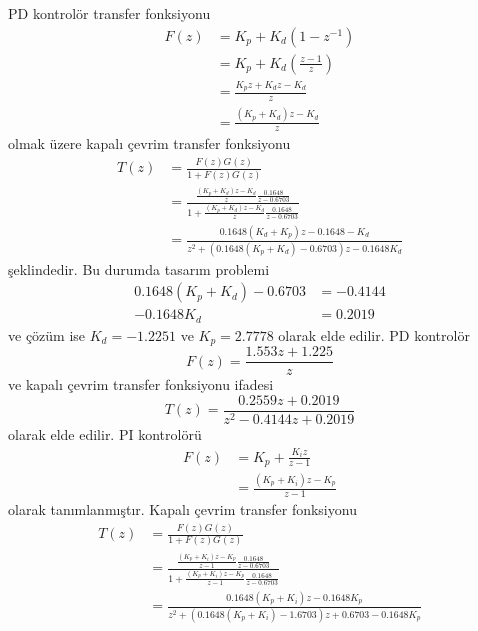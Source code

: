 PD kontrolör transfer fonksiyonu
\begin{equation}
\begin{split}
    F(z)&=K_p+K_d(1-z^{-1})\\
    &=K_p+K_d(\frac{z-1}{z})\\
    &=\frac{K_pz+K_dz-K_d}{z}\\
    &=\frac{(K_p+K_d)z-K_d}{z}
\end{split}
\end{equation}
olmak üzere kapalı çevrim transfer fonksiyonu
\begin{equation}
    \begin{split}
        T(z)&=\frac{F(z)G(z)}{1+F(z)G(z)}\\
        &=\frac{\frac{(K_p+K_d)z-K_d}{z}\frac{0.1648}{z-0.6703}}{1+\frac{(K_p+K_d)z-K_d}{z}\frac{0.1648}{z-0.6703}}\\
        &=\frac{0.1648(K_d+K_p)z-0.1648-K_d}{z^2+(0.1648(K_p+K_d)-0.6703)z-0.1648K_d}
    \end{split}
\end{equation}
şeklindedir. Bu durumda tasarım problemi
\begin{equation}
    \begin{split}
        0.1648(K_p+K_d)-0.6703&=-0.4144\\
        -0.1648K_d&=0.2019
    \end{split}
\end{equation}
ve çözüm ise $K_d=-1.2251$ ve $K_p=2.7778$ olarak elde edilir. PD kontrolör
\begin{equation}
    F(z)=\frac{1.553 z + 1.225}{z}
\end{equation}
ve kapalı çevrim transfer fonksiyonu ifadesi
\begin{equation}
    T(z)=\frac{0.2559 z + 0.2019}{z^2 - 0.4144 z + 0.2019}
\end{equation}
olarak elde edilir. PI kontrolörü 
\begin{equation}
\begin{split}
    F(z)&=K_p+\frac{K_iz}{z-1}\\
    &=\frac{(K_p+K_i)z-K_p}{z-1}
\end{split}
\end{equation}
olarak tanımlanmıştır. Kapalı çevrim transfer fonksiyonu 
\begin{equation}
    \begin{split}
        T(z)&=\frac{F(z)G(z)}{1+F(z)G(z)}\\
        &=\frac{\frac{(K_p+K_i)z-K_p}{z-1}\frac{0.1648}{z-0.6703}}{1+\frac{(K_p+K_i)z-K_p}{z-1}\frac{0.1648}{z-0.6703}}\\
        &=\frac{0.1648(K_p+K_i)z-0.1648K_p}{z^2+(0.1648(K_p+K_i)-1.6703)z+0.6703-0.1648K_p}
    \end{split}
\end{equation}
